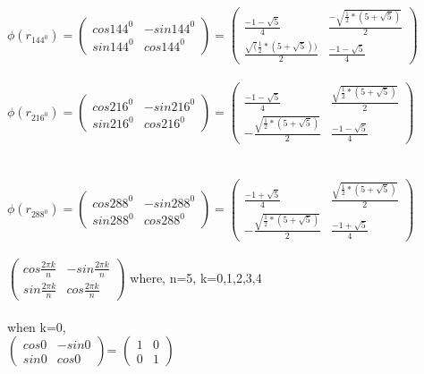 \documentclass{article}
\begin{document}
\\
$\phi (r_{144^0}) = 
\begin{pmatrix}
cos 144^0 & -sin 144^0\\
sin 144^0 & cos144^0
\end{pmatrix} =
\begin{pmatrix}
\frac{-1-\sqrt{5}}{4} & \frac{-\sqrt{\frac{1}{2}*(5+\sqrt{5})}}{2}\\
\frac{\sqrt(\frac{1}{2}*(5+\sqrt{5}))}{2}& \frac{-1-\sqrt{5}}{4}
\end{pmatrix} $\\
\\

$\phi (r_{216^0}) = 
\begin{pmatrix}
cos 216^0 & -sin 216^0\\
sin 216^0 & cos216^0
\end{pmatrix} =
\begin{pmatrix}
\frac{-1-\sqrt{5}}{4} & \frac{\sqrt{\frac{1}{2}*(5+\sqrt{5})}}{2}\\
-\frac{\sqrt{\frac{1}{2}*(5+\sqrt{5})}}{2}& \frac{-1-\sqrt{5}}{4}
\end{pmatrix} $\\\\

\\
$\phi (r_{288^0}) = 
\begin{pmatrix}
cos 288^0 & -sin 288^0\\
sin 288^0 & cos288^0
\end{pmatrix} =
\begin{pmatrix}
\frac{-1+\sqrt{5}}{4} & \frac{\sqrt{\frac{1}{2}*(5+\sqrt{5})}}{2}\\
-\frac{\sqrt{\frac{1}{2}*(5+\sqrt{5})}}{2}& \frac{-1+\sqrt{5}}{4}
\end{pmatrix} $\\\\


$\begin{pmatrix}
cos \frac{2 \pi k}{n} & -sin \frac{2 \pi k}{n}\\
sin \frac{2 \pi k}{n} & cos\frac{2 \pi k}{n}
\end{pmatrix}$
where, n=5, k=0,1,2,3,4\\\\

when k=0,\\
$\begin{pmatrix}
cos 0 & -sin 0\\
sin 0 & cos0
\end{pmatrix}$=
$\begin{pmatrix}
1 & 0\\
0 & 1
\end{pmatrix}$\\
\end{document}
